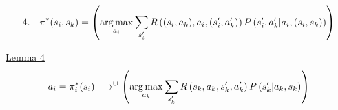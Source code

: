  \begin{equation*}
4.\quad\pi^\ast(s_i, s_k) =\left( \operatorname*{arg\,max}_{a_i} \sum_{s^\prime_i}  R\left((s_i, a_k), a_i,(s^\prime_i, a^\prime_k) \right) P\left( s^\prime_i, a^\prime_k \middle| a_i,  (s_i, s_k) \right) \right)
\end{equation*}

\textasteriskcentered \quad \underline{Lemma 4}\\

\begin{equation*}
a_i = \pi^\ast_i(s_i) \longrightarrow^{\cup} \left( \operatorname*{arg\,max}_{a_k} \sum_{s^\prime_k}  R\left(s_k, a_k, s^\prime_k, a^\prime_k \right) P\left( s^\prime_k \middle| a_k, s_k \right) \right)
\end{equation*}

\begin{center}
\end{center}